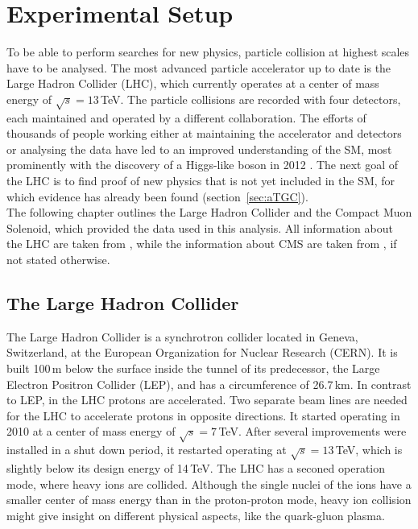 \chapter{Experimental Setup}
\label{chap:expsetup}
To be able to perform searches for new physics, particle collision at highest scales have to be analysed. The most advanced particle accelerator up to date is the Large Hadron Collider (LHC), which currently operates at a center of mass energy of $\sqrt{s}= 13$\,TeV. The particle collisions are recorded with four detectors, each maintained and operated by a different collaboration. The efforts of thousands of people working either at maintaining the accelerator and detectors or analysing the data have led to an improved understanding of the SM, most prominently with the discovery of a Higgs-like boson in 2012 \cite{cms_higgsdiscov,atlas_higgsdiscov}. The next goal of the LHC is to find proof of new physics that is not yet included in the SM, for which evidence has already been found (section~\ref{sec:aTGC}).\\

\noindent The following chapter outlines the Large Hadron Collider and the Compact Muon Solenoid, which provided the data used in this analysis. All information about the LHC are taken from \cite{lhc_machine}, while the information about CMS are taken from \cite{CMS_design,strip_fig}, if not stated otherwise.

\section{The Large Hadron Collider}
The Large Hadron Collider is a synchrotron collider located in Geneva, Switzerland, at the European Organization for Nuclear Research (CERN). It is built 100\,m below the surface inside the tunnel of its predecessor, the Large Electron Positron Collider (LEP), and has a circumference of 26.7\,km. In contrast to LEP, in the LHC protons are accelerated. Two separate beam lines are needed for the LHC to accelerate protons in opposite directions. It started operating in 2010 at a center of mass energy of $\sqrt{s}=7$\,TeV. After several improvements were installed in a shut down period, it restarted operating at $\sqrt{s}=13$\,TeV, which is slightly below its design energy of 14\,TeV. The LHC has a seconed operation mode, where heavy ions are collided. Although the single nuclei of the ions have a smaller center of mass energy than in the proton-proton mode, heavy ion collision might give insight on different physical aspects, like the quark-gluon plasma.\\

